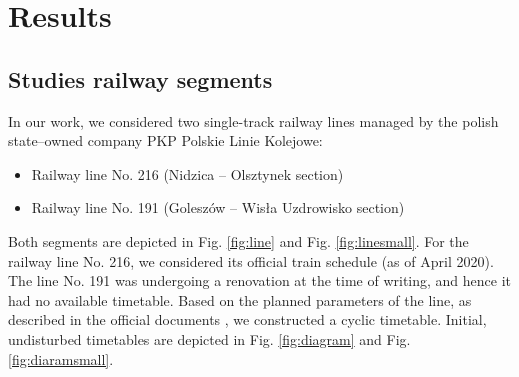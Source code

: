 \section{Results}

\subsection{Studies railway segments}
In our work, we considered two single-track railway lines managed by the polish state--owned
company PKP Polskie Linie Kolejowe:

\begin{itemize}
	\item Railway line No. 216 (Nidzica -- Olsztynek section)
	\item Railway line No. 191 (Goleszów -- Wisła Uzdrowisko section)
\end{itemize}


Both segments are depicted in Fig. \ref{fig:line} and Fig. \ref{fig:linesmall}.
For the railway line No. 216, we considered its official train schedule (as of April 2020). The
line No. 191 was undergoing a renovation at the time of writing, and hence it had no
available timetable. Based on the planned parameters of the line, as described in the official
documents \cite{PKPPLK}, we constructed a cyclic timetable. Initial, undisturbed timetables are
depicted in Fig. \ref{fig:diagram} and Fig. \ref{fig:diaramsmall}.


